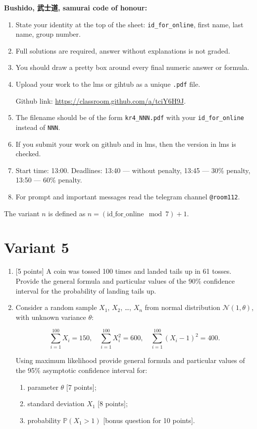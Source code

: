 \documentclass[12pt]{article}
\def \cN{\mathcal{N}}
\def \P{\mathbb{P}}
\newcommand \id {\mathrm{id}\_\mathrm{for}\_\mathrm{online}}
\begin{document}
\textbf{Bushido, 武士道, samurai code of honour:}

\vspace{5mm}

\begin{enumerate}
\item State your identity at the top of the sheet: \verb|id_for_online|, first name, last name, group number.
\item Full solutions are required, answer without explanations is not graded. 
\item You should draw a pretty box around every final numeric answer or formula.
\item Upload your work to the lms or gihtub as a unique \verb|.pdf| file.

Github link: \url{https://classroom.github.com/a/tciY6H9J}.
\item The filename should be of the form \verb|kr4_NNN.pdf| with your \verb|id_for_online| instead of \verb|NNN|.
\item If you submit your work on github and in lms, then the version in lms is checked.
\item Start time: 13:00. Deadlines: 13:40 — without penalty, 13:45 — 30\% penalty, 13:50 — 60\% penalty.
\item For prompt and important messages read the telegram channel \verb|@room112|.
\end{enumerate}


\newpage

The variant $n$ is defined as $n=(\id \mod 7)+1$. 


\section*{Variant 5}
\begin{enumerate}

\item {[5 points]} A coin was tossed 100 times and landed tails up in 61 tosses.
Provide the general formula and particular values
of the 90\% confidence interval for the probability of landing tails up.

\item Consider a random sample $X_1$, $X_2$, \ldots, $X_n$ from normal distribution $\cN(1, \theta)$, 
with unknown variance $\theta$:

\[
\sum_{i=1}^{100} X_i = 150, \quad \sum_{i=1}^{100} X_i^2 = 600, \quad \sum_{i=1}^{100} (X_i - 1)^2 = 400.  
\]

Using maximum likelihood 
provide general formula and particular values
of the 95\% asymptotic confidence interval for:

\begin{enumerate}
  \item parameter $\theta$ {[7 points]};
  \item standard deviation $X_1$ {[8 points]};
  \item probability $\P(X_1 > 1)$ {[bonus question for 10 points]}.
\end{enumerate}

\end{enumerate}
\end{document}
